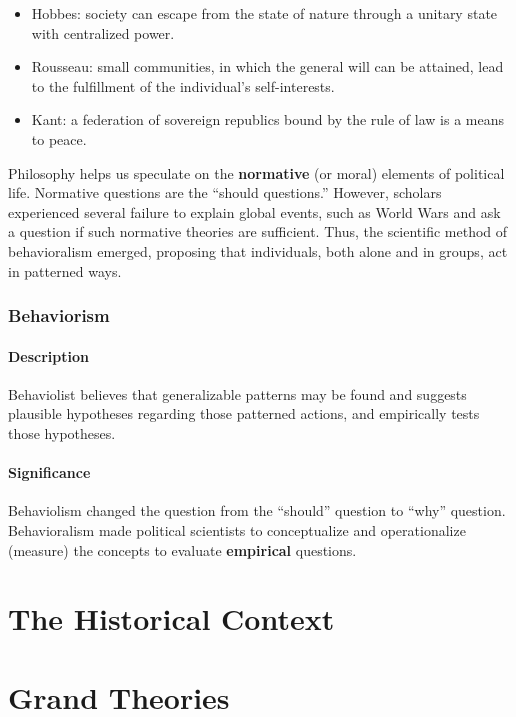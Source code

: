 \documentclass[
]{book}
\begin{document}
\begin{itemize}
\item
  Hobbes: society can escape from the state of nature through a unitary state with centralized power.
\item
  Rousseau: small communities, in which the general will can be attained, lead to the fulfillment of the individual's self-interests.
\item
  Kant: a federation of sovereign republics bound by the rule of law is a means to peace.
\end{itemize}

Philosophy helps us speculate on the \textbf{normative} (or moral) elements of political life. Normative questions are the ``should questions.'' However, scholars experienced several failure to explain global events, such as World Wars and ask a question if such normative theories are sufficient. Thus, the scientific method of behavioralism emerged, proposing that individuals, both alone and in groups, act in patterned ways.

\hypertarget{behaviorism}{%
\subsection{Behaviorism}\label{behaviorism}}

\hypertarget{description}{%
\subsubsection{Description}\label{description}}

Behaviolist believes that generalizable patterns may be found and suggests plausible hypotheses regarding those patterned actions, and empirically tests those hypotheses.

\hypertarget{significance}{%
\subsubsection{Significance}\label{significance}}

Behaviolism changed the question from the ``should'' question to ``why'' question. Behavioralism made political scientists to conceptualize and operationalize (measure) the concepts to evaluate \textbf{empirical} questions.

\hypertarget{the-historical-context}{%
\chapter{The Historical Context}\label{the-historical-context}}

\hypertarget{grand-theories}{%
\chapter{Grand Theories}\label{grand-theories}}

  
\end{document}
